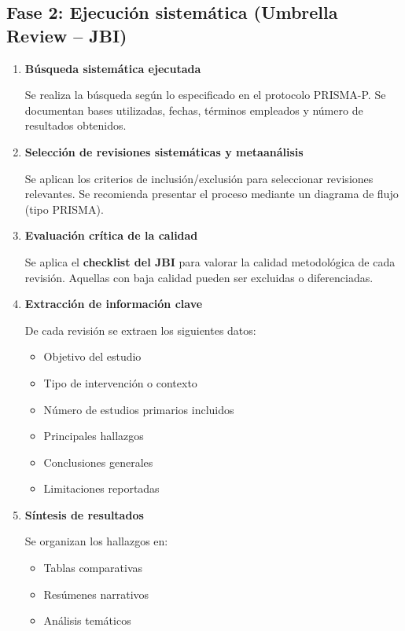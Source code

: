 \subsection*{Fase 2: Ejecución sistemática (Umbrella Review – JBI)}

\begin{enumerate}[resume]
    \item \textbf{Búsqueda sistemática ejecutada}

    Se realiza la búsqueda según lo especificado en el protocolo PRISMA-P. Se documentan bases utilizadas, fechas, términos empleados y número de resultados obtenidos.

    \item \textbf{Selección de revisiones sistemáticas y metaanálisis}

    Se aplican los criterios de inclusión/exclusión para seleccionar revisiones relevantes. Se recomienda presentar el proceso mediante un diagrama de flujo (tipo PRISMA).

    \item \textbf{Evaluación crítica de la calidad}

    Se aplica el \textbf{checklist del JBI} para valorar la calidad metodológica de cada revisión. Aquellas con baja calidad pueden ser excluidas o diferenciadas.

    \item \textbf{Extracción de información clave}

    De cada revisión se extraen los siguientes datos:

    \begin{itemize}
        \item Objetivo del estudio
        \item Tipo de intervención o contexto
        \item Número de estudios primarios incluidos
        \item Principales hallazgos
        \item Conclusiones generales
        \item Limitaciones reportadas
    \end{itemize}

    \item \textbf{Síntesis de resultados}

    Se organizan los hallazgos en:

    \begin{itemize}
        \item Tablas comparativas
        \item Resúmenes narrativos
        \item Análisis temáticos
    \end{itemize}


\end{enumerate}
